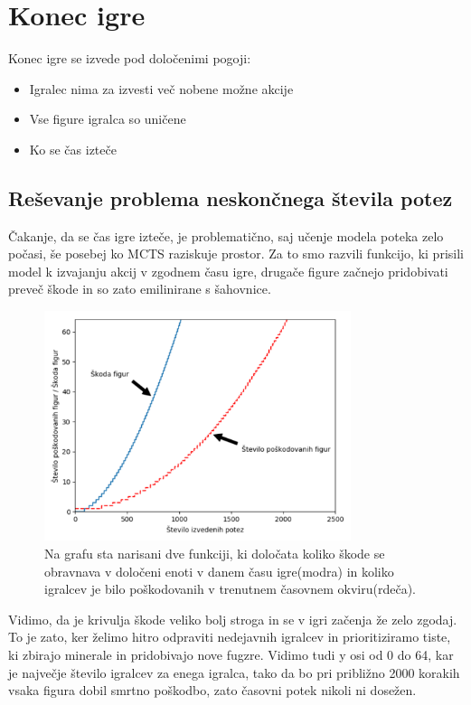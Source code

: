 \documentclass[a4paper, 12pt]{book}
\begin{document}
\section{Konec igre}

Konec igre se izvede pod določenimi pogoji:
\begin{itemize}
	\item Igralec nima za izvesti več nobene možne akcije
	\item Vse figure igralca so uničene
	\item Ko se čas izteče
\end{itemize}


\subsection{Reševanje problema neskončnega števila potez}
Čakanje, da se čas igre izteče, je problematično, saj učenje modela poteka zelo počasi, še posebej ko MCTS raziskuje prostor.
Za to smo razvili funkcijo, ki prisili model k izvajanju akcij v zgodnem času igre, drugače figure začnejo pridobivati preveč škode in so zato emilinirane s šahovnice.


\begin{figure}[h]
	\begin{center}
		\includegraphics[width=0.8\textwidth]{destroy_formula_2018_10_20.pdf}
	\end{center}
	\caption{Na grafu sta narisani dve funkciji, ki določata koliko škode se obravnava v določeni enoti v danem času igre(modra) in koliko igralcev je bilo poškodovanih v trenutnem časovnem okviru(rdeča).}
	\label{destroy_formula_2018_10_20}
\end{figure}


Vidimo, da je krivulja škode veliko bolj stroga in se v igri začenja že zelo zgodaj. To je zato, ker želimo hitro odpraviti nedejavnih igralcev in prioritiziramo tiste, ki zbirajo minerale in pridobivajo nove fugzre. Vidimo tudi y osi od 0 do 64, kar je največje število igralcev za enega igralca, tako da bo pri približno 2000 korakih vsaka figura dobil smrtno poškodbo, zato časovni potek nikoli ni dosežen.
\end{document}
